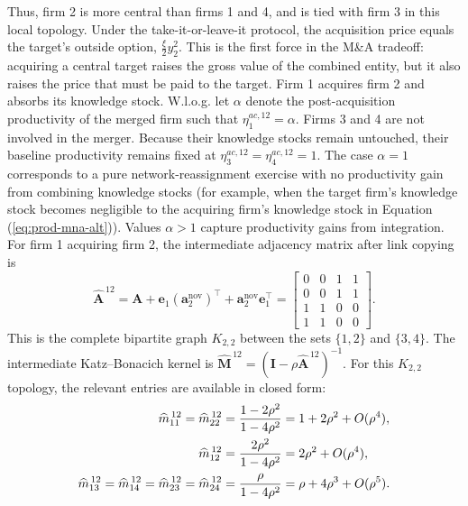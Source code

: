 Thus, firm 2 is more central than firms 1 and 4, and is tied with firm 3 in this
local topology. Under the take-it-or-leave-it protocol, the acquisition price equals
the target's outside option,
$
\frac{\xi}{2}y_{2}^2.
$ 
This is the first force in the M\&A tradeoff: acquiring a central target raises the
gross value of the combined entity, but it also raises the price that must be paid to
the target. Firm 1 acquires firm 2 and absorbs its knowledge stock. W.l.o.g. let $\alpha$ denote the post-acquisition productivity of the merged firm such that  
$
\eta_{1}^{ac,12}
=
\alpha$. Firms 3 and 4 are not involved in the merger. Because their knowledge stocks remain untouched, their baseline productivity remains fixed at $\eta_{3}^{ac,12}
=
\eta_{4}^{ac,12}
=
1$. The case
$\alpha=1$ corresponds to a pure network-reassignment exercise with no productivity
gain from combining knowledge stocks (for example, when the target firm's knowledge stock becomes negligible to the acquiring firm's knowledge stock in Equation (\ref{eq:prod-mna-alt})). Values $\alpha>1$ capture productivity gains
from integration. For firm 1 acquiring firm 2, the intermediate adjacency matrix after link copying is
\begin{equation}
\widehat{\mathbf{A}}^{\,12}
=
\mathbf{A}
+
\mathbf{e}_1
\left(\mathbf{a}_2^{\text{nov}}\right)^{\top}
+
\mathbf{a}_2^{\text{nov}}\mathbf{e}_1^{\top}
=
\begin{bmatrix}
0 & 0 & 1 & 1 \\
0 & 0 & 1 & 1 \\
1 & 1 & 0 & 0 \\
1 & 1 & 0 & 0
\end{bmatrix}.
\label{eq:corrected-intermediate-A}
\end{equation}
This is the complete bipartite graph $K_{2,2}$ between the sets $\{1,2\}$ and
$\{3,4\}$. The intermediate Katz--Bonacich kernel is
$
\widehat{\mathbf{M}}^{\,12}
=
(\mathbf{I}-\rho\widehat{\mathbf{A}}^{\,12})^{-1}.
$ 
For this $K_{2,2}$ topology, the relevant entries are available in closed form:
\begin{align}
\widehat m_{11}^{\,12}
=
\widehat m_{22}^{\,12}
&=
\frac{1-2\rho^2}{1-4\rho^2}
=
1+2\rho^2+O(\rho^4),
\notag\\
\widehat m_{12}^{\,12}
&=
\frac{2\rho^2}{1-4\rho^2}
=
2\rho^2+O(\rho^4),
\notag\\
\widehat m_{13}^{\,12}
=
\widehat m_{14}^{\,12}
=
\widehat m_{23}^{\,12}
=
\widehat m_{24}^{\,12}
&=
\frac{\rho}{1-4\rho^2}
=
\rho+4\rho^3+O(\rho^5).
\label{eq:intermediate-kernel-example}
\end{align}
